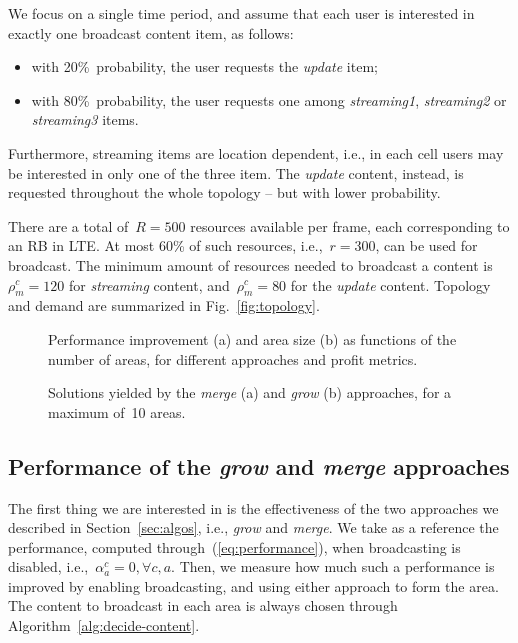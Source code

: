 \documentclass[10pt, conference, compsocconf]{IEEEtran}
\numberwithin{equation}{section}
\begin{document}
We focus on a single time period, and assume that each user is interested in exactly one 
broadcast content item, as follows:
\begin{itemize}
\item with 20\%~probability, the user requests the {\em update} item;
\item with 80\%~probability, the user requests one among 
{\em streaming1}, {\em streaming2} or {\em streaming3} items.
\end{itemize}
Furthermore, streaming items are location dependent, i.e., in each
cell users may be interested in only one of the three item. The {\em
  update} content, instead, 
is requested throughout the whole topology -- but with lower probability.

There are a total of~$R=500$ resources available per frame, each
corresponding to an 
RB in LTE. At most  60\% of such resources, i.e.,~$r=300$, can be
used for broadcast. The minimum amount of resources needed to broadcast
a content is~$\rho^c_m=120$ for {\em streaming} content, and~$\rho^c_m=80$ for
the {\em update} content.
Topology and demand are summarized in Fig.~\ref{fig:topology}.

\begin{figure}[t]
\centering
{}
\caption{Performance improvement (a) and area size (b) as  functions of the number 
of areas, for different approaches and profit metrics.
}
\end{figure}

\begin{figure}[b]
\centering
{}
\caption{
Solutions yielded by the {\em merge} (a) and {\em grow} (b) approaches,
for a maximum of~10 areas.
\label{fig:base-solutions}
}
\end{figure}

\subsection{Performance of the {\em grow} and {\em merge} approaches}

The first thing we are interested in is the effectiveness of the two
approaches we described in Section~\ref{sec:algos}, i.e., {\em grow} and
{\em merge}. We take as a reference the performance, computed
through~(\ref{eq:performance}), when broadcasting is disabled,
i.e.,~$\alpha^c_a=0,\forall c,a$. Then, we measure how much such a
performance is improved by enabling broadcasting, and using either
approach to form the area. The content to broadcast in each area is
always chosen through Algorithm~\ref{alg:decide-content}.
\end{document}
